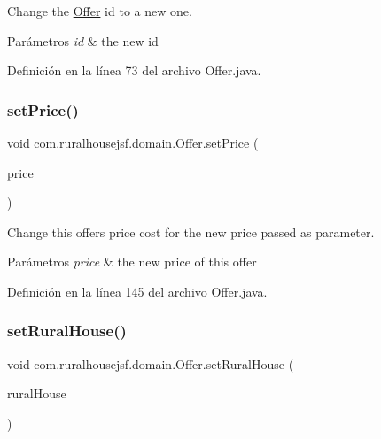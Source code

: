Change the \mbox{\hyperlink{a00184}{Offer}} id to a new one. 


\begin{DoxyParams}{Parámetros}
{\em id} & the new id \\
\hline
\end{DoxyParams}


Definición en la línea 73 del archivo Offer.\+java.

\mbox{\label{a00184_aaf77b7df1299a14ecc9cae2040dec6af}} 
\subsubsection{\texorpdfstring{setPrice()}{setPrice()}}
{\footnotesize\ttfamily void com.\+ruralhousejsf.\+domain.\+Offer.\+set\+Price (\begin{DoxyParamCaption}\item[{double}]{price }\end{DoxyParamCaption})}



Change this offers price cost for the new price passed as parameter. 


\begin{DoxyParams}{Parámetros}
{\em price} & the new price of this offer \\
\hline
\end{DoxyParams}


Definición en la línea 145 del archivo Offer.\+java.

\mbox{\label{a00184_ab10c2d200d23aff2383f720b1dcecd02}} 
\subsubsection{\texorpdfstring{setRuralHouse()}{setRuralHouse()}}
{\footnotesize\ttfamily void com.\+ruralhousejsf.\+domain.\+Offer.\+set\+Rural\+House (\begin{DoxyParamCaption}\item[{\mbox{\hyperlink{a00188}{Rural\+House}}}]{rural\+House }\end{DoxyParamCaption})}



